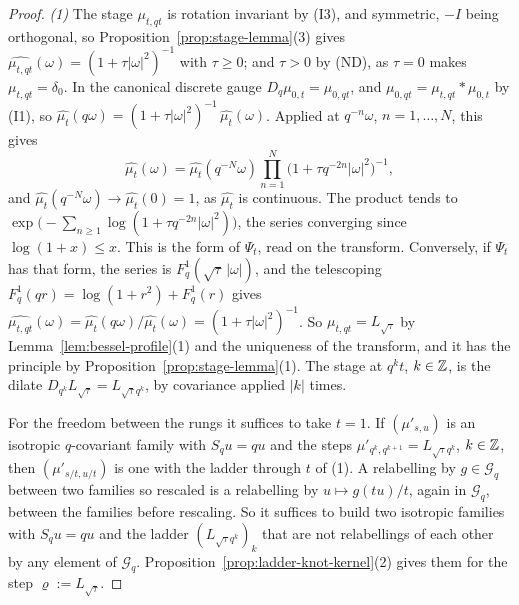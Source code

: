 \begin{proof}
\emph{(1)} The stage $\mu_{t,qt}$ is rotation invariant by (I3), and symmetric, $-I$ being
orthogonal, so Proposition~\ref{prop:stage-lemma}(3) gives
$\widehat{\mu_{t,qt}}(\omega) = (1 + \tau|\omega|^2)^{-1}$ with $\tau \ge 0$; and $\tau > 0$ by
(ND), as $\tau = 0$ makes $\mu_{t,qt} = \delta_0$. In the canonical discrete gauge
$D_q\mu_{0,t} = \mu_{0,qt}$, and $\mu_{0,qt} = \mu_{t,qt} * \mu_{0,t}$ by (I1), so
$\widehat{\mu_t}(q\omega) = (1 + \tau|\omega|^2)^{-1}\,\widehat{\mu_t}(\omega)$. Applied at
$q^{-n}\omega$, $n = 1, \dots, N$, this gives
\[
  \widehat{\mu_t}(\omega) = \widehat{\mu_t}(q^{-N}\omega)\prod_{n=1}^N
    \bigl(1 + \tau q^{-2n}|\omega|^2\bigr)^{-1} ,
\]
and $\widehat{\mu_t}(q^{-N}\omega) \to \widehat{\mu_t}(0) = 1$, as $\widehat{\mu_t}$ is
continuous. The product tends to $\exp\bigl(-\sum_{n \ge 1}\log(1 + \tau q^{-2n}|\omega|^2)\bigr)$,
the series converging since $\log(1 + x) \le x$. This is the form of $\Psi_t$, read on the
transform. Conversely, if $\Psi_t$ has that form, the series is $F^1_q(\sqrt\tau\,|\omega|)$, and
the telescoping $F^1_q(qr) = \log(1 + r^2) + F^1_q(r)$ gives
$\widehat{\mu_{t,qt}}(\omega) = \widehat{\mu_t}(q\omega)/\widehat{\mu_t}(\omega) =
(1 + \tau|\omega|^2)^{-1}$. So $\mu_{t,qt} = L_{\sqrt\tau}$ by Lemma~\ref{lem:bessel-profile}(1)
and the uniqueness of the transform, and it has the principle by
Proposition~\ref{prop:stage-lemma}(1). The stage at $q^kt$, $k \in \mathbb{Z}$, is the dilate
$D_{q^k}L_{\sqrt\tau} = L_{\sqrt\tau q^k}$, by covariance applied $|k|$ times.

For the freedom between the rungs it suffices to take $t = 1$. If $(\mu'_{s,u})$ is an isotropic
$q$-covariant family with $S_qu = qu$ and the steps $\mu'_{q^k,q^{k+1}} = L_{\sqrt\tau q^k}$,
$k \in \mathbb{Z}$, then $(\mu'_{s/t,u/t})$ is one with the ladder through $t$ of (1). A relabelling by
$g \in \mathcal{G}_q$ between two families so rescaled is a relabelling by
$u \mapsto g(tu)/t$, again in $\mathcal{G}_q$, between the families before rescaling. So it
suffices to build two isotropic families with $S_qu = qu$ and the ladder $(L_{\sqrt\tau q^k})_k$
that are not relabellings of each other by any element of $\mathcal{G}_q$.
Proposition~\ref{prop:ladder-knot-kernel}(2) gives them for the step $\varrho := L_{\sqrt\tau}$.


\end{proof}
